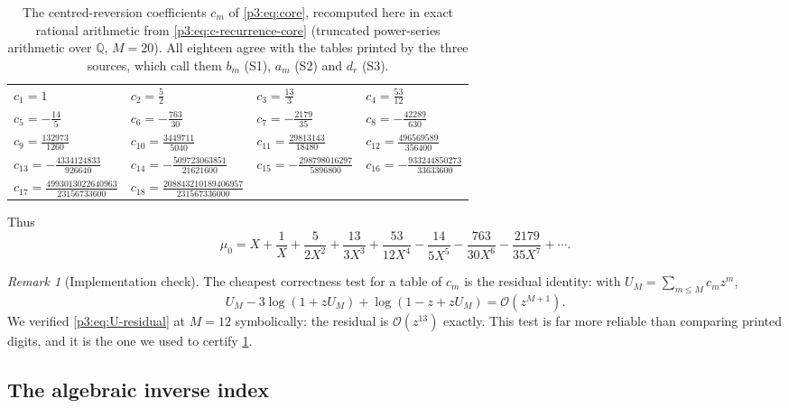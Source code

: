 \documentclass[11pt,a4paper,oneside]{book}
\theoremstyle{plain}
\theoremstyle{definition}
\theoremstyle{remark}
\newtheorem{remark}[theorem]{Remark}
\newcommand{\Rat}{\mathbb{Q}}
\newcommand{\bigO}{\mathcal{O}}
\begin{document}
\begin{table}[htbp]
\centering
\caption{The centred-reversion coefficients $c_{m}$ of
\cref{p3:eq:core}, recomputed here in exact rational arithmetic from
\cref{p3:eq:c-recurrence-core} (truncated power-series arithmetic over
$\Rat$, $M=20$).  All eighteen agree with the tables printed by the three
sources, which call them $b_{m}$ (S1), $a_{m}$ (S2) and $d_{r}$ (S3).}
\label{p3:tab:cm}
\small
\begin{tabular}{@{}llll@{}}
\toprule
$c_{1}=1$ & $c_{2}=\tfrac52$ & $c_{3}=\tfrac{13}3$ & $c_{4}=\tfrac{53}{12}$\\
$c_{5}=-\tfrac{14}5$ & $c_{6}=-\tfrac{763}{30}$ & $c_{7}=-\tfrac{2179}{35}$
 & $c_{8}=-\tfrac{42289}{630}$\\
$c_{9}=\tfrac{132973}{1260}$ & $c_{10}=\tfrac{3449711}{5040}$
 & $c_{11}=\tfrac{29813143}{18480}$ & $c_{12}=\tfrac{496569589}{356400}$\\
$c_{13}=-\tfrac{4334124833}{926640}$ & $c_{14}=-\tfrac{509723063851}{21621600}$
 & $c_{15}=-\tfrac{298798016297}{5896800}$
 & $c_{16}=-\tfrac{933244850273}{33633600}$\\
$c_{17}=\tfrac{4993013022640963}{23156733600}$
 & $c_{18}=\tfrac{208843210189406957}{231567336000}$ & &\\
\bottomrule
\end{tabular}
\end{table}

Thus
\begin{equation}\label{p3:eq:core-explicit}
 \mu_{0}=X+\frac1X+\frac5{2X^{2}}+\frac{13}{3X^{3}}+\frac{53}{12X^{4}}
 -\frac{14}{5X^{5}}-\frac{763}{30X^{6}}-\frac{2179}{35X^{7}}+\cdots.
\end{equation}

\begin{remark}[Implementation check]\label{p3:rem:U-residual}
The cheapest correctness test for a table of $c_{m}$ is the residual identity: with
$U_{M}=\sum_{m\le M}c_{m}z^{m}$,
\begin{equation}\label{p3:eq:U-residual}
 U_{M}-3\log(1+zU_{M})+\log(1-z+zU_{M})=\bigO(z^{M+1}).
\end{equation}
We verified \cref{p3:eq:U-residual} at $M=12$ symbolically: the residual is $\bigO(z^{13})$
exactly. This test is far more reliable than comparing printed digits, and it is the one we used
to certify \cref{p3:tab:cm}.
\end{remark}

\subsection{The algebraic inverse index}
\end{document}
